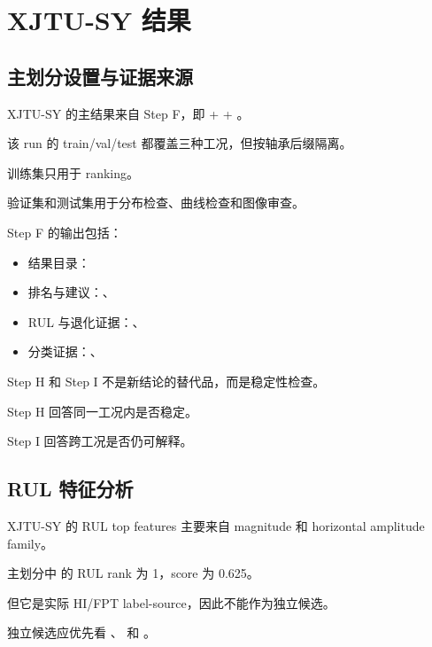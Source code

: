 \section{XJTU-SY 结果}

\subsection{主划分设置与证据来源}

XJTU-SY 的主结果来自 Step F，即  +  + 。

该 run 的 train/val/test 都覆盖三种工况，但按轴承后缀隔离。

训练集只用于 ranking。

验证集和测试集用于分布检查、曲线检查和图像审查。

Step F 的输出包括：

\begin{itemize}[leftmargin=2em]
  \item 结果目录：
  \item 排名与建议：、
  \item RUL 与退化证据：、
  \item 分类证据：、
\end{itemize}

Step H 和 Step I 不是新结论的替代品，而是稳定性检查。

Step H 回答同一工况内是否稳定。

Step I 回答跨工况是否仍可解释。



\subsection{RUL 特征分析}

XJTU-SY 的 RUL top features 主要来自 magnitude 和 horizontal amplitude family。

主划分中  的 RUL rank 为 1，score 为 0.625。

但它是实际 HI/FPT label-source，因此不能作为独立候选。

独立候选应优先看 、 和 。

